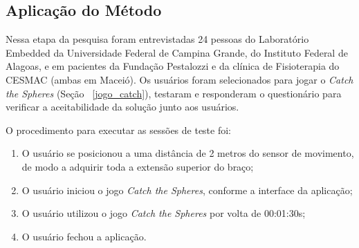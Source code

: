\subsection{Aplicação do Método}
%


Nessa etapa da pesquisa foram entrevistadas 24 pessoas do Laboratório Embedded da Universidade Federal de Campina Grande, do Instituto Federal de Alagoas, e em pacientes da Fundação Pestalozzi e da clínica de Fisioterapia do CESMAC (ambas em Maceió). Os usuários foram selecionados para jogar o \emph{Catch the Spheres} (Seção ~\ref{jogo_catch}), testaram e responderam o questionário para verificar a aceitabilidade da solução junto aos usuários. 

O procedimento para executar as sessões de teste foi:
\begin{enumerate}
	\item O usuário se posicionou a uma distância de 2 metros do sensor de movimento, de modo a adquirir toda a extensão superior do braço; 	
	\item O usuário iniciou o jogo \textit{Catch the Spheres}, conforme a interface da aplicação;
	\item O usuário utilizou o jogo \textit{Catch the Spheres} por volta de 00:01:30s;
	\item O usuário fechou a aplicação.
\end{enumerate}

